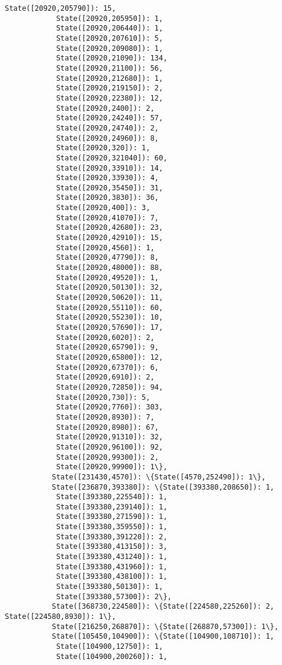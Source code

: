 \documentclass[11pt]{article}
\begin{document}
\begin{Verbatim}[commandchars=\\\{\}]
            State([20920,205790]): 15,
            State([20920,205950]): 1,
            State([20920,206440]): 1,
            State([20920,207610]): 5,
            State([20920,209080]): 1,
            State([20920,21090]): 134,
            State([20920,21100]): 56,
            State([20920,212680]): 1,
            State([20920,219150]): 2,
            State([20920,22380]): 12,
            State([20920,2400]): 2,
            State([20920,24240]): 57,
            State([20920,24740]): 2,
            State([20920,24960]): 8,
            State([20920,320]): 1,
            State([20920,321040]): 60,
            State([20920,33910]): 14,
            State([20920,33930]): 4,
            State([20920,35450]): 31,
            State([20920,3830]): 36,
            State([20920,400]): 3,
            State([20920,41070]): 7,
            State([20920,42680]): 23,
            State([20920,42910]): 15,
            State([20920,4560]): 1,
            State([20920,47790]): 8,
            State([20920,48000]): 88,
            State([20920,49520]): 1,
            State([20920,50130]): 32,
            State([20920,50620]): 11,
            State([20920,55110]): 60,
            State([20920,55230]): 10,
            State([20920,57690]): 17,
            State([20920,6020]): 2,
            State([20920,65790]): 9,
            State([20920,65800]): 12,
            State([20920,67370]): 6,
            State([20920,6910]): 2,
            State([20920,72850]): 94,
            State([20920,730]): 5,
            State([20920,7760]): 303,
            State([20920,8930]): 7,
            State([20920,8980]): 67,
            State([20920,91310]): 32,
            State([20920,96100]): 92,
            State([20920,99300]): 2,
            State([20920,99900]): 1\},
           State([231430,4570]): \{State([4570,252490]): 1\},
           State([236870,393380]): \{State([393380,208650]): 1,
            State([393380,225540]): 1,
            State([393380,239140]): 1,
            State([393380,271590]): 1,
            State([393380,359550]): 1,
            State([393380,391220]): 2,
            State([393380,413150]): 3,
            State([393380,431240]): 1,
            State([393380,431960]): 1,
            State([393380,438100]): 1,
            State([393380,50130]): 1,
            State([393380,57300]): 2\},
           State([368730,224580]): \{State([224580,225260]): 2, State([224580,8930]): 1\},
           State([216250,268870]): \{State([268870,57300]): 1\},
           State([105450,104900]): \{State([104900,108710]): 1,
            State([104900,12750]): 1,
            State([104900,200260]): 1,

\end{Verbatim}
\end{document}
